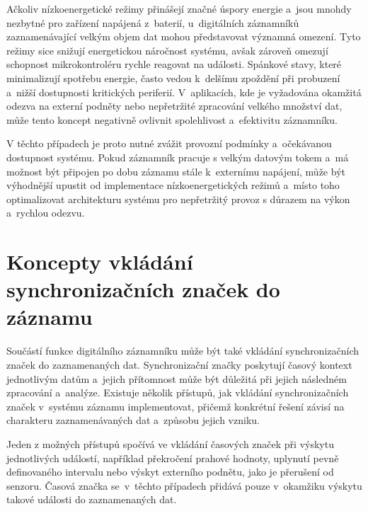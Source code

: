 Ačkoliv nízkoenergetické režimy přinášejí značné úspory energie a~jsou mnohdy nezbytné pro zařízení napájená z~baterií, u~digitálních záznamníků zaznamenávající velkým objem dat mohou představovat významná omezení. Tyto režimy sice snižují energetickou náročnost systému, avšak zároveň omezují schopnost mikrokontroléru rychle reagovat na události. Spánkové stavy, které minimalizují spotřebu energie, často vedou k~delšímu zpoždění při probuzení a~nižší dostupnosti kritických periferií. V~aplikacích, kde je vyžadována okamžitá odezva na externí podněty nebo nepřetržité zpracování velkého množství dat, může tento koncept negativně ovlivnit spolehlivost a~efektivitu záznamníku.~\cite{embedded_low_power_modes}

V těchto případech je proto nutné zvážit provozní podmínky a~očekávanou dostupnost systému. Pokud záznamník pracuje s velkým datovým tokem a~má možnost být připojen po dobu záznamu stále k~externímu napájení, může být výhodnější upustit od implementace nízkoenergetických režimů a~místo toho optimalizovat architekturu systému pro nepřetržitý provoz s důrazem na výkon a~rychlou odezvu.~\cite{analog_devices_low_power_modes}


\section{Koncepty vkládání synchronizačních značek do záznamu} 
\label{casove_znacky}
Součástí funkce digitálního záznamníku může být také vkládání synchronizačních značek do zaznamenaných dat. Synchronizační značky poskytují časový kontext jednotlivým datům a~jejich přítomnost může být důležitá při jejich následném zpracování a~analýze. Existuje několik přístupů, jak vkládání synchronizačních značek v~systému záznamu implementovat, přičemž konkrétní řešení závisí na charakteru zaznamenávaných dat a~způsobu jejich vzniku.~\cite{researchgate_general_dataloggger_multiple_sdcards, perny2008zarizeni_cas_znacky}

Jeden z možných přístupů spočívá ve vkládání časových značek při výskytu jednotlivých událostí, například překročení prahové hodnoty, uplynutí pevně definovaného intervalu nebo výskyt externího podnětu, jako je přerušení od senzoru. Časová značka se~v~těchto případech přidává pouze v~okamžiku výskytu takové události do zaznamenaných dat.~\cite{datalogger_implementation_temperature, researchgate_general_dataloggger_multiple_sdcards, ieee_multi_connectivity_datalogger_sd_card}

